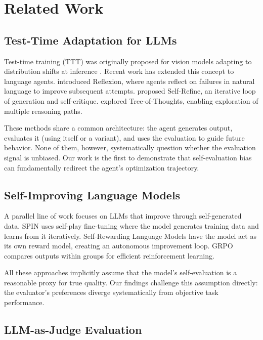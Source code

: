 \documentclass[11pt,a4paper]{article}
\begin{document}
\section{Related Work}

\subsection{Test-Time Adaptation for LLMs}

Test-time training (TTT) was originally proposed for vision models adapting to distribution shifts at inference \cite{sun2020testtime}. Recent work has extended this concept to language agents. \citet{shinn2023reflexion} introduced Reflexion, where agents reflect on failures in natural language to improve subsequent attempts. \citet{madaan2023selfrefine} proposed Self-Refine, an iterative loop of generation and self-critique. \citet{yao2023tree} explored Tree-of-Thoughts, enabling exploration of multiple reasoning paths.

These methods share a common architecture: the agent generates output, evaluates it (using itself or a variant), and uses the evaluation to guide future behavior. None of them, however, systematically question whether the evaluation signal is unbiased. Our work is the first to demonstrate that self-evaluation bias can fundamentally redirect the agent's optimization trajectory.

\subsection{Self-Improving Language Models}

A parallel line of work focuses on LLMs that improve through self-generated data. SPIN \cite{chen2024spin} uses self-play fine-tuning where the model generates training data and learns from it iteratively. Self-Rewarding Language Models \cite{yuan2024selfrewarding} have the model act as its own reward model, creating an autonomous improvement loop. GRPO \cite{deepseek2024v3} compares outputs within groups for efficient reinforcement learning.

All these approaches implicitly assume that the model's self-evaluation is a reasonable proxy for true quality. Our findings challenge this assumption directly: the evaluator's preferences diverge systematically from objective task performance.

\subsection{LLM-as-Judge Evaluation}
\end{document}
